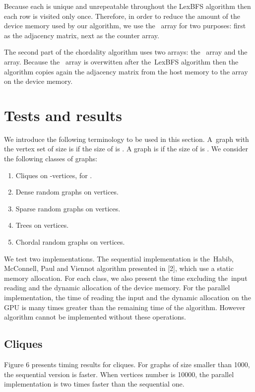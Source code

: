 \documentclass[a4paper, 11pt]{article}
\begin{document}
Because each  is unique and unrepeatable throughout the LexBFS algorithm then each row 
is visited only once. Therefore, in order to reduce the amount of the device memory used by our 
algorithm, we use the~  array for two purposes: first as the adjacency matrix, 
next as the counter array. 

The second part of the chordality algorithm uses two arrays: the~ array and the  array. 
Because the~ array is overwitten after the~LexBFS algorithm then the algorithm 
copies again the adjacency matrix from the host memory to the  array on the device memory.

\section{Tests and results}

We introduce the following terminology to be used in this section. A~graph  with the 
vertex set  of size  is  if the size of  is . A graph  is  
if the size of  is . We consider the following classes of graphs:

\begin{enumerate}
    \item Cliques on -vertices, for .
    \item Dense random graphs on  vertices.
    \item Sparse random graphs on  vertices.
    \item Trees on  vertices.
    \item Chordal random graphs on  vertices.
\end{enumerate}

We test two implementations. The sequential implementation is the~Habib, McConnell, Paul and 
Viennot algorithm presented in [2], which use a static memory allocation. For each class, we 
also present the time excluding the~input reading and the dynamic allocation of the device 
memory. For the parallel implementation, the time of reading the input and the dynamic allocation 
on the GPU is many times greater than the remaining time of the algorithm. However algorithm 
cannot be implemented without these operations.

\newpage
\subsection{Cliques}

Figure 6 presents timing results for cliques. For graphs of size smaller than 1000, the
sequential version is faster. When vertices number is 10000, the parallel implementation is 
two times faster than the sequential one. 
\end{document}

